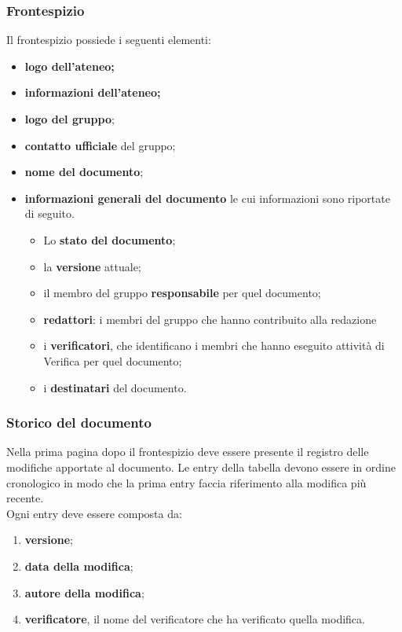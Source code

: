 \documentclass[a4paper,12pt]{article}
\begin{document}
\subsubsection*{Frontespizio}
Il frontespizio possiede i seguenti elementi:
\begin{itemize}
    \item \textbf{logo dell'ateneo;}
    \item \textbf{informazioni dell'ateneo;}
    \item \textbf{logo del gruppo};
    \item \textbf{contatto ufficiale} del gruppo;
    \item \textbf{nome del documento};
    \item \textbf{informazioni generali del documento} le cui informazioni sono riportate di seguito.
    \begin{itemize}
        \item Lo \textbf{stato del documento};
        \item la \textbf{versione} attuale;
        \item il membro del gruppo \textbf{responsabile} per quel documento;
        \item \textbf{redattori}: i membri del gruppo che hanno contribuito alla redazione 
        \item i \textbf{verificatori}, che identificano i membri che hanno eseguito attività di Verifica per quel documento; 
        \item i \textbf{destinatari} del documento.
    \end{itemize}
\end{itemize}

\subsubsection*{Storico del documento}
Nella prima pagina dopo il frontespizio deve essere presente il registro delle modifiche apportate al documento. Le entry della tabella devono essere in ordine cronologico in modo che la prima entry faccia riferimento alla modifica più recente.
\\Ogni entry deve essere composta da:
\begin{enumerate}
    \item \textbf{versione};
    \item \textbf{data della modifica};
    \item \textbf{autore della modifica};
    \item \textbf{verificatore}, il nome del verificatore che ha verificato quella modifica.
\end{enumerate}
\end{document}
